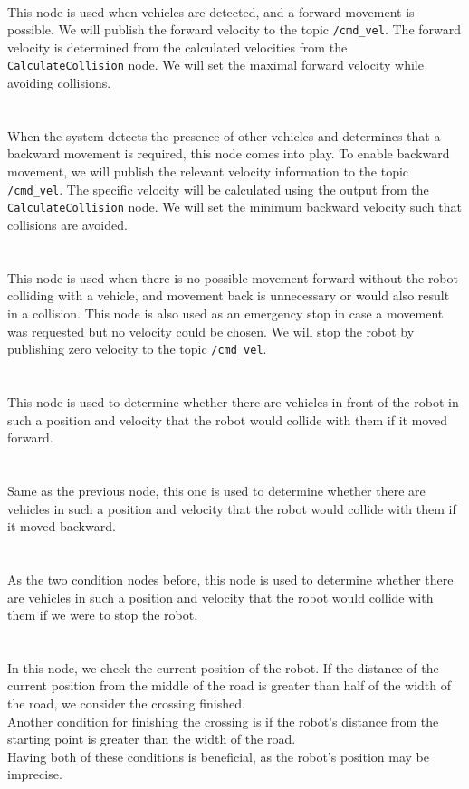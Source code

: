     \\
        This node is used when vehicles are detected, and a forward movement is possible. We will publish the forward velocity to the topic \texttt{/cmd\_vel}. The forward velocity is determined from the calculated velocities from the \texttt{CalculateCollision} node. We will set the maximal forward velocity while avoiding collisions.\\\\
    \\
        When the system detects the presence of other vehicles and determines that a backward movement is required, this node comes into play. To enable backward movement, we will publish the relevant velocity information to the topic \texttt{/cmd\_vel}. The specific velocity will be calculated using the output from the \texttt{CalculateCollision} node. We will set the minimum backward velocity such that collisions are avoided.\\\\
    \\
        This node is used when there is no possible movement forward without the robot colliding with a vehicle, and movement back is unnecessary or would also result in a collision. This node is also used as an emergency stop in case a movement was requested but no velocity could be chosen. We will stop the robot by publishing zero velocity to the topic \texttt{/cmd\_vel}.\\\\
    \\
        This node is used to determine whether there are vehicles in front of the robot in such a position and velocity that the robot would collide with them if it moved forward.\\\\
    \\
        Same as the previous node, this one is used to determine whether there are vehicles in such a position and velocity that the robot would collide with them if it moved backward.\\\\
    \\
        As the two condition nodes before, this node is used to determine whether there are vehicles in such a position and velocity that the robot would collide with them if we were to stop the robot.\\\\
    \\
        In this node, we check the current position of the robot. If the distance of the current position from the middle of the road is greater than half of the width of the road, we consider the crossing finished.\\
        Another condition for finishing the crossing is if the robot's distance from the starting point is greater than the width of the road.\\
        Having both of these conditions is beneficial, as the robot's position may be imprecise.
